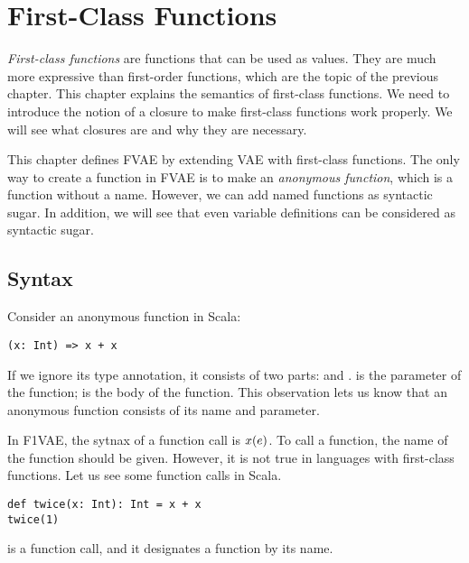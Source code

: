 \setchapterpreamble[u]{\margintoc}
\chapter{First-Class Functions}

\renewcommand{\plang}{\textsf{VAE}\xspace}
\renewcommand{\lang}{\textsf{FVAE}\xspace}

\textit{First-class functions} are functions that
can be used as values. They are much more expressive than first-order functions,
which are the topic of the previous chapter. This chapter explains the semantics
of first-class functions. We need to introduce the notion of a closure to make
first-class functions work properly. We will see what closures are and why they
are necessary.

This chapter defines \lang by extending \plang with first-class functions.
The only way to create a function in \lang is to make an \textit{anonymous
function}, which is a function without a name.
However, we can add named functions as syntactic sugar. In addition,
we will see that even variable definitions can be considered as syntactic sugar.

\section{Syntax}

Consider an anonymous function in Scala:

\begin{verbatim}
(x: Int) => x + x
\end{verbatim}

If we ignore its type annotation, it consists of two parts:  and .  is the parameter of the function;  is the body of the
function. This observation lets us know that an anonymous function consists of
its name and parameter.

In \textsf{F1VAE}, the sytnax of a function call is $x(e)$. To call a
function, the name of the function should be given. However, it is not true in
languages with first-class functions. Let us see some function calls in Scala.

\begin{verbatim}
def twice(x: Int): Int = x + x
twice(1)
\end{verbatim}

 is a function call, and it designates a function by its name.

